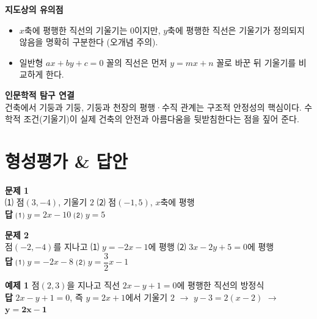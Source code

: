 \documentclass[11pt,a4paper]{article}
\begin{document}
\vspace{8pt}
\begin{minipage}[t]{0.48\linewidth}
\begin{calloutbox}
\textbf{지도상의 유의점}
\begin{itemize}[leftmargin=1.2em, itemsep=2pt, topsep=4pt]
  \item $x$축에 평행한 직선의 기울기는 $0$이지만, $y$축에 평행한 직선은 기울기가 정의되지 않음을 명확히 구분한다 (오개념 주의).
  \item 일반형 $ax+by+c=0$ 꼴의 직선은 먼저 $y=mx+n$ 꼴로 바꾼 뒤 기울기를 비교하게 한다.
\end{itemize}
\end{calloutbox}
\end{minipage}\hfill
\begin{minipage}[t]{0.48\linewidth}
\begin{notebox}
\textbf{인문학적 탐구 연결}\\
건축에서 기둥과 기둥, 기둥과 천장의 평행·수직 관계는 구조적 안정성의 핵심이다. 수학적 조건(기울기)이 실제 건축의 안전과 아름다움을 뒷받침한다는 점을 짚어 준다.
\end{notebox}
\end{minipage}

\section{형성평가 \& 답안}

\begin{minipage}[t]{0.48\linewidth}
\begin{answerbox}
\textbf{문제 1}\\
\small ⑴ 점$(3,-4)$, 기울기 $2$ \quad ⑵ 점$(-1,5)$, $x$축에 평행\\[4pt]
\textbf{\color{goldstrong}답} \; ⑴ $y=2x-10$ \quad ⑵ $y=5$
\end{answerbox}
\end{minipage}\hfill
\begin{minipage}[t]{0.48\linewidth}
\begin{answerbox}
\textbf{문제 2}\\
\small 점$(-2,-4)$를 지나고 ⑴ $y=-2x-1$에 평행 \quad ⑵ $3x-2y+5=0$에 평행\\[4pt]
\textbf{\color{goldstrong}답} \; ⑴ $y=-2x-8$ \quad ⑵ $y=\dfrac{3}{2}x-1$
\end{answerbox}
\end{minipage}

\vspace{6pt}
\begin{answerbox}
\textbf{예제 1} \quad 점$(2,3)$을 지나고 직선 $2x-y+1=0$에 평행한 직선의 방정식\\
\textbf{\color{goldstrong}답} \; $2x-y+1=0$, 즉 $y=2x+1$에서 기울기 $2$ $\to$ $y-3=2(x-2)$ $\to$ $\boldsymbol{y=2x-1}$
\end{answerbox}
\end{document}
